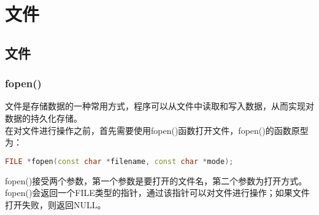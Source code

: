 \chapter{文件}

\section{文件}

\subsection{fopen()}

文件是存储数据的一种常用方式，程序可以从文件中读取和写入数据，从而实现对数据的持久化存储。\\

在对文件进行操作之前，首先需要使用fopen()函数打开文件，fopen()的函数原型为：

\vspace{-0.5cm}

\begin{lstlisting}[language=C++]
FILE *fopen(const char *filename, const char *mode);
\end{lstlisting}

fopen()接受两个参数，第一个参数是要打开的文件名，第二个参数为打开方式。fopen()会返回一个FILE类型的指针，通过该指针可以对文件进行操作；如果文件打开失败，则返回NULL。\\

\begin{table}[H]
    \centering
    \caption{文件打开方式}
\end{table}

